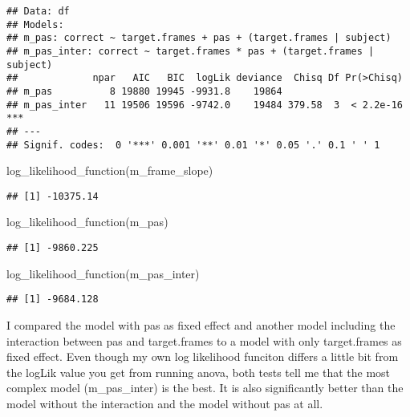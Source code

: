 \documentclass[
]{article}
\newenvironment{Shaded}{\begin{snugshade}}{\end{snugshade}}
\newcommand{\FunctionTok}[1]{\textcolor[rgb]{0.00,0.00,0.00}{#1}}
\newcommand{\NormalTok}[1]{#1}
\begin{document}
\begin{verbatim}
## Data: df
## Models:
## m_pas: correct ~ target.frames + pas + (target.frames | subject)
## m_pas_inter: correct ~ target.frames * pas + (target.frames | subject)
##             npar   AIC   BIC  logLik deviance  Chisq Df Pr(>Chisq)    
## m_pas          8 19880 19945 -9931.8    19864                         
## m_pas_inter   11 19506 19596 -9742.0    19484 379.58  3  < 2.2e-16 ***
## ---
## Signif. codes:  0 '***' 0.001 '**' 0.01 '*' 0.05 '.' 0.1 ' ' 1
\end{verbatim}

\begin{Shaded}
\begin{Highlighting}[]
\FunctionTok{log\_likelihood\_function}\NormalTok{(m\_frame\_slope)}
\end{Highlighting}
\end{Shaded}

\begin{verbatim}
## [1] -10375.14
\end{verbatim}

\begin{Shaded}
\begin{Highlighting}[]
\FunctionTok{log\_likelihood\_function}\NormalTok{(m\_pas)}
\end{Highlighting}
\end{Shaded}

\begin{verbatim}
## [1] -9860.225
\end{verbatim}

\begin{Shaded}
\begin{Highlighting}[]
\FunctionTok{log\_likelihood\_function}\NormalTok{(m\_pas\_inter)}
\end{Highlighting}
\end{Shaded}

\begin{verbatim}
## [1] -9684.128
\end{verbatim}

I compared the model with pas as fixed effect and another model
including the interaction between pas and target.frames to a model with
only target.frames as fixed effect. Even though my own log likelihood
funciton differs a little bit from the logLik value you get from running
anova, both tests tell me that the most complex model (m\_pas\_inter) is
the best. It is also significantly better than the model without the
interaction and the model without pas at all.
\end{document}

